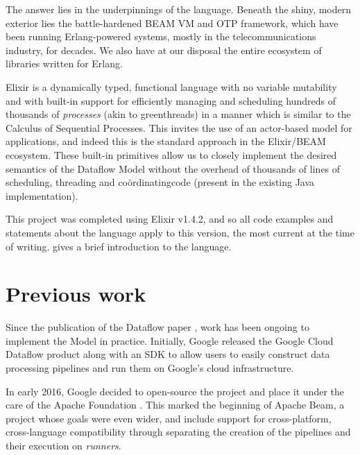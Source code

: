 The answer lies in the underpinnings of the language.
Beneath the shiny, modern exterior lies the battle-hardened BEAM VM and OTP framework, which have been running Erlang-powered systems, mostly in the telecommunications industry, for decades.
We also have at our disposal the entire ecosystem of libraries written for Erlang.

Elixir is a dynamically typed, functional language with no variable mutability and with built-in support for efficiently managing and scheduling hundreds of thousands of \emph{processes} (akin to greenthreads) in a manner which is similar to the Calculus of Sequential Processes.
This invites the use of an actor-based model for applications, and indeed this is the standard approach in the Elixir/BEAM ecosystem.
These built-in primitives allow us to closely implement the desired semantics of the Dataflow Model without the overhead of thousands of lines of scheduling, threading and co\"ordinating\footnotemark[1] code (present in the existing Java implementation).


This project was completed using Elixir v1.4.2, and so all code examples and statements about the language apply to this version, the most current at the time of writing.
 gives a brief introduction to the language.



\section{Previous work}\label{sec:intro:previous}
Since the publication of the Dataflow paper \cite{Akidau:2015}, work has been ongoing to implement the Model in practice.
Initially, Google released the Google Cloud Dataflow product \cite{CloudDataflow} along with an SDK to allow users to easily construct data processing pipelines and run them on Google's cloud infrastructure.

In early 2016, Google decided to open-source the project and place it under the care of the Apache Foundation \cite{ApacheDataflowPost}.
This marked the beginning of Apache Beam, a project whose goals were even wider, and include support for cross-platform, cross-language compatibility through separating the creation of the pipelines and their execution on \emph{runners}.

